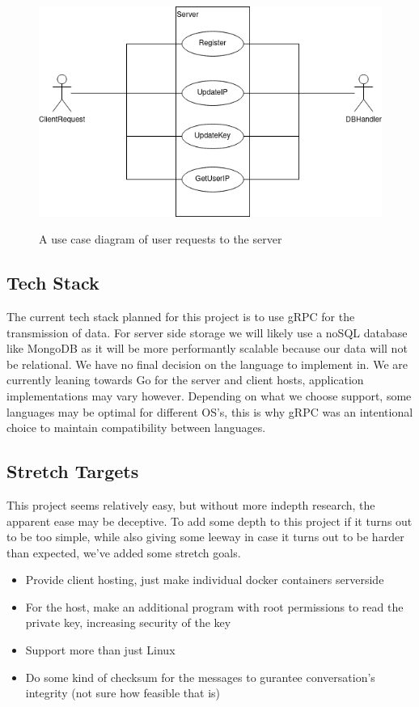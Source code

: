 \documentclass[titlepage]{article}
\begin{document}
    \begin{center}
        \begin{figure}[!ht]
            \includegraphics[scale=.5]{graphics/ServerUseCase.png}
            \label{serverUse}
            \caption{A use case diagram of user requests to the server}
        \end{figure}
    \end{center}

    \subsection{Tech Stack}

    The current tech stack planned for this project is to use gRPC for the transmission of data.
    For server side storage we will likely use a noSQL database like MongoDB as it will be more performantly scalable because our data will not be relational.
    We have no final decision on the language to implement in. 
    We are currently leaning towards Go for the server and client hosts, application implementations may vary however.
    Depending on what we choose support, some languages may be optimal for different OS's, this is why gRPC was an intentional choice to maintain compatibility between languages.

    \subsection{Stretch Targets}

    This project seems relatively easy, but without more indepth research, the apparent ease may be deceptive.
    To add some depth to this project if it turns out to be too simple, while also giving some leeway in case it turns out to be harder than expected, we've added some stretch goals.
    \begin{itemize}
        \item Provide client hosting, just make individual docker containers serverside
        \item For the host, make an additional program with root permissions to read the private key, increasing security of the key
        \item Support more than just Linux
        \item Do some kind of checksum for the messages to gurantee conversation's integrity (not sure how feasible that is)
    \end{itemize}
\end{document}
